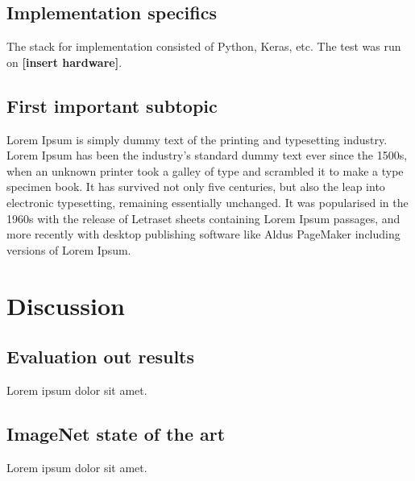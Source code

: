 \documentclass{kthreport}
\begin{document}
\subsection{Implementation specifics}

The stack for implementation consisted of Python, Keras, etc. The test was run on \textbf{[insert hardware]}.


\subsection{First important subtopic}

Lorem Ipsum is simply dummy text of the printing and typesetting industry. Lorem Ipsum has been the industry's standard dummy text ever since the 1500s, when an unknown printer took a galley of type and scrambled it to make a type specimen book. It has survived not only five centuries, but also the leap into electronic typesetting, remaining essentially unchanged. It was popularised in the 1960s with the release of Letraset sheets containing Lorem Ipsum passages, and more recently with desktop publishing software like Aldus PageMaker including versions of Lorem Ipsum.



\section{Discussion}

\subsection{Evaluation out results}

Lorem ipsum dolor sit amet.

\subsection{ImageNet state of the art}

Lorem ipsum dolor sit amet.



{}

\end{document}
